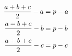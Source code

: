 \documentclass[preview]{standalone}
\begin{document}
\begin{align*}
\special{dvisvgm:raw <g id='unique000'>}\frac{a+b+c}{2} - a &= p - a \\ \special{dvisvgm:raw </g>}\special{dvisvgm:raw <g id='unique001'>}\frac{a+b+c}{2} - b &= p - b \\ \special{dvisvgm:raw </g>}\special{dvisvgm:raw <g id='unique002'>}\frac{a+b+c}{2} - c &= p - c\special{dvisvgm:raw </g>}
\end{align*}
\end{document}
